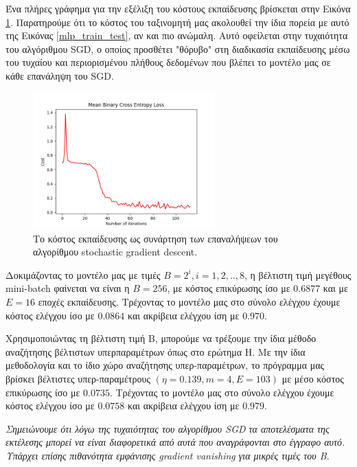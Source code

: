 \documentclass{article}
\begin{document}
 Ένα πλήρες γράφημα για την εξέλιξη του κόστους εκπαίδευσης βρίσκεται στην Εικόνα \ref{sgd_train_test}. Παρατηρούμε ότι το κόστος του ταξινομητή μας ακολουθεί την ίδια πορεία με αυτό της Εικόνας \ref{mlp_train_test}, αν και πιο ανώμαλη. Αυτό οφείλεται στην τυχαιότητα του αλγόριθμου SGD, ο οποίος προσθέτει "θόρυβο" στη διαδικασία εκπαίδευσης μέσω του τυχαίου και περιορισμένου πλήθους δεδομένων που βλέπει το μοντέλο μας σε κάθε επανάληψη του SGD.
 
 \begin{figure}[H]
 	\includegraphics[width=7cm]{sgd_error.png}
 	\centering
 	\caption{Το κόστος εκπαίδευσης ως συνάρτηση των επαναλήψεων του αλγορίθμου stochastic gradient descent.}
 	\label{sgd_train_test}
 \end{figure}

Δοκιμάζοντας το μοντέλο μας με τιμές $Β=2^{i}, i=1,2,..,8$, η βέλτιστη τιμή μεγέθους mini-batch φαίνεται να είναι η $B=256$, με κόστος επικύρωσης ίσο με $0.6877$ και με $Ε=16$ εποχές εκπαίδευσης. Τρέχοντας το μοντέλο μας στο σύνολο ελέγχου έχουμε κόστος ελέγχου ίσο με $0.0864$ και ακρίβεια ελέγχου ίση με $0.970$.

 Χρησιμοποιώντας τη βέλτιστη τιμή B, μπορούμε να τρέξουμε την ίδια μέθοδο αναζήτησης βέλτιστων υπερπαραμέτρων όπως στο ερώτημα Η. Με την ίδια μεθοδολογία και το ίδιο χώρο αναζήτησης υπερ-παραμέτρων, το πρόγραμμα μας βρίσκει βέλτιστες υπερ-παραμέτρους $(\eta=0.139, m=4, E=103)$ με μέσο κόστος επικύρωσης ίσο με $0.0735$. Τρέχοντας το μοντέλο μας στο σύνολο ελέγχου έχουμε κόστος ελέγχου ίσο με $0.0758$ και ακρίβεια ελέγχου ίση με $0.979$.

\textit{Σημειώνουμε ότι λόγω της τυχαιότητας του αλγορίθμου SGD τα αποτελέσματα της εκτέλεσης μπορεί να είναι διαφορετικά από αυτά που αναγράφονται στο έγγραφο αυτό. Υπάρχει επίσης πιθανότητα εμφάνισης gradient vanishing για μικρές τιμές του B.}


\printbibliography
\end{document}
